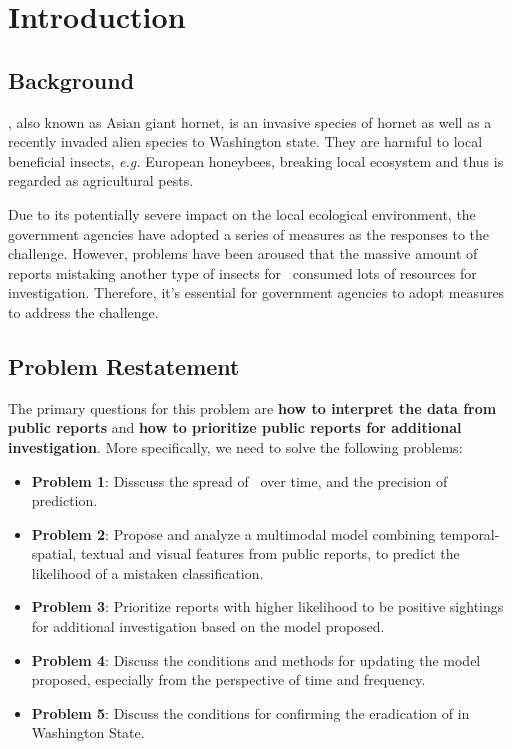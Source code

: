 \documentclass{mcmthesis}
\begin{document}
\maketitle

\begin{spacing}{0.2}
    \tableofcontents
\end{spacing}
\newpage


\section{Introduction}
\subsection{Background}

\VM, also known as Asian giant hornet, is an invasive species of hornet as well as a recently invaded alien species to Washington state. They are harmful to local beneficial insects, \emph{e.g.} European honeybees, breaking local ecosystem and thus is regarded as agricultural pests.

Due to its potentially severe impact on the local ecological environment, the government agencies have adopted a series of measures as the responses to the challenge. However, problems have been aroused that the massive amount of reports mistaking another type of insects for \VM \ consumed lots of resources for investigation. Therefore, it's essential for government agencies to adopt measures to address the challenge. 

\subsection{Problem Restatement}

The primary questions for this problem are \textbf{how to interpret the data from public reports} and \textbf{how to prioritize public reports for additional investigation}. More specifically, we need to solve the following problems:

\begin{itemize}
    \item \textbf{Problem 1}: Disscuss the spread of \VM \ over time, and the precision of prediction.
    \item \textbf{Problem 2}: Propose and analyze a multimodal model combining temporal-spatial, textual and visual features from public reports, to predict the likelihood of a mistaken classification.
    \item \textbf{Problem 3}: Prioritize reports with higher likelihood to be positive sightings for additional investigation based on the model proposed.
    \item \textbf{Problem 4}: Discuss the conditions and methods for updating the model proposed, especially from the perspective of time and frequency.
    \item \textbf{Problem 5}: Discuss the conditions for confirming the eradication of \VM in Washington State.
\end{itemize}
\end{document}
